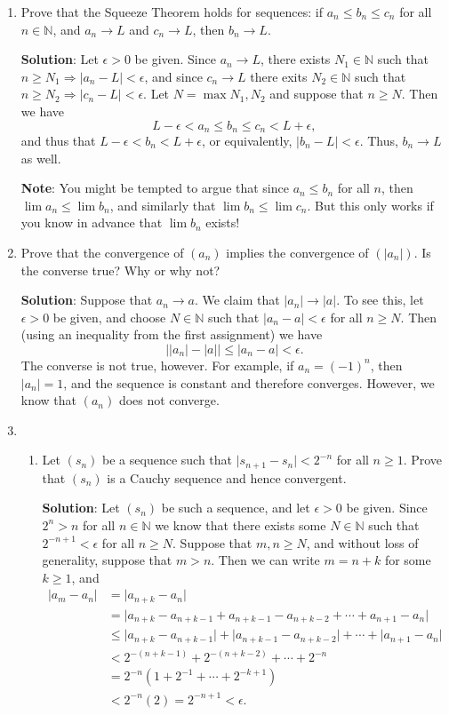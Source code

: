 \documentclass[letterpaper,12pt]{article}
\newcommand{\N}{\mathbb{N}}
\newcommand{\abs}[1]{\lvert #1\rvert}
\begin{document}
\begin{enumerate}
\begin{enumerate}
\end{enumerate}
\item Prove that the Squeeze Theorem holds for sequences: if $a_n\leq b_n\leq c_n$ for all $n\in \N$, and $a_n\to L$ and $c_n\to L$, then $b_n\to L$.

 
\bigskip

{\bf Solution}: Let $\epsilon>0$ be given. Since $a_n\to L$, there exists $N_1\in\N$ such that $n\geq N_1\Rightarrow \abs{a_n-L}<\epsilon$, and since $c_n\to L$ there exits $N_2\in\N$ such that $n\geq N_2\Rightarrow \abs{c_n-L}<\epsilon$. Let $N=\max{N_1,N_2}$ and suppose that $n\geq N$. Then we have
\[
L-\epsilon<a_n\leq b_n\leq c_n<L+\epsilon,
\]
and thus that $L-\epsilon<b_n<L+\epsilon$, or equivalently, $\abs{b_n-L}<\epsilon$. Thus, $b_n\to L$ as well.

{\bf Note}: You might be tempted to argue that since $a_n\leq b_n$ for all $n$, then $\lim a_n\leq \lim b_n$, and similarly that $\lim b_n\leq \lim c_n$. But this only works if you know in advance that $\lim b_n$ exists!


 \item Prove that the convergence of $(a_n)$ implies the convergence of $(\abs{a_n})$. Is the converse true? Why or why not?
  
\bigskip

{\bf Solution}: Suppose that $a_n\to a$. We claim that $\abs{a_n}\to \abs{a}$. To see this, let $\epsilon>0$ be given, and choose $N\in \N$ such that $\abs{a_n-a}<\epsilon$ for all $n\geq N$. Then (using an inequality from the first assignment) we have
\[
\abs{\abs{a_n}-\abs{a}}\leq \abs{a_n-a}<\epsilon.
\]
The converse is not true, however. For example, if $a_n=(-1)^n$, then $\abs{a_n}=1$, and the sequence is constant and therefore converges. However, we know that $(a_n)$ does not converge.

 \item \begin{enumerate}
        \item Let $(s_n)$ be a sequence such that $\abs{s_{n+1}-s_n}<2^{-n}$ for all $n\geq 1$. Prove that $(s_n)$ is a Cauchy sequence and hence convergent. 

 
\bigskip

{\bf Solution}: Let $(s_n)$ be such a sequence, and let $\epsilon>0$ be given. Since $2^n>n$ for all $n\in \N$ we know that there exists some $N\in\N$ such that $2^{-n+1}<\epsilon$ for all $n\geq N$. Suppose that $m,n\geq N$, and without loss of generality, suppose that $m>n$. Then we can write $m=n+k$ for some $k\geq 1$, and
\begin{align*}
\abs{a_m-a_n} & = \abs{a_{n+k}-a_n}\\
& = \abs{a_{n+k}-a_{n+k-1}+a_{n+k-1}-a_{n+k-2}+\cdots + a_{n+1}-a_n}\\
& \leq \abs{a_{n+k}-a_{n+k-1}}+\abs{a_{n+k-1}-a_{n+k-2}}+\cdots + \abs{a_{n+1}-a_n}\\
& < 2^{-(n+k-1)}+2^{-(n+k-2)}+\cdots + 2^{-n}\\
& = 2^{-n}(1+2^{-1}+\cdots + 2^{-k+1})\\
& < 2^{-n}(2) = 2^{-n+1}<\epsilon.
\end{align*}



\end{enumerate}
\end{enumerate}
\end{document}
